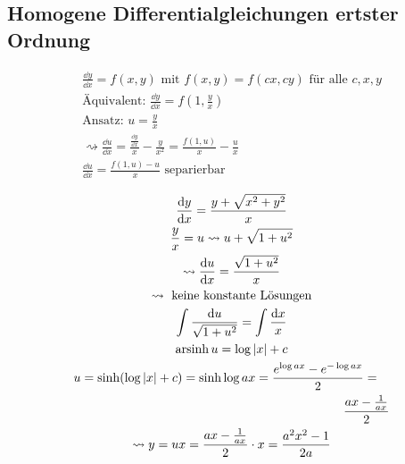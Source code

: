 \subsection{Homogene Differentialgleichungen ertster Ordnung}
\begin{gather*}
	\frac{\dd y}{\dd x} = f(x,y) \text{ mit } f(x,y) = f(cx,cy) \text{ für alle } c , x , y \\
	\text{Äquivalent: } \frac{\dd y}{\dd x} = f\left( 1 , \frac{y}{x} \right) \\
	\text{Ansatz: } u = \frac{y}{x} \\
	\rightsquigarrow \frac{\dd u}{\dd x} = \frac{\frac{\dd y}{\dd x}}{x} - \frac{y}{x^2} = \frac{f(1,u)}{x} - \frac{u}{x} \\
	\frac{\dd u}{\dd x} = \frac{f(1,u) - u}{x} \text{ separierbar}
\end{gather*}
\begin{bsp*}
	\begin{gather*}
		\frac{\dd y}{\dd x} = \frac{y+\sqrt{x^2+y^2}}{x} \\
		\frac{y}{x} = u \rightsquigarrow u + \sqrt{1+u^2} \\
		\rightsquigarrow \frac{\dd u}{\dd x} = \frac{\sqrt{1+u^2}}{x} \\
		\rightsquigarrow \text{ keine konstante Lösungen} \\
		\int \frac{\dd u}{\sqrt{1+u^2}} = \int \frac{\dd x}{x} \\
		\arsinh u = \log\abs{x} + c \\
		\begin{multlined}
			u = \sinh( \log\abs{x} + c) = \sinh\log ax = \frac{e^{\log ax} - e^{-\log ax}}{2} = \\
			\frac{ax - \frac{1}{ax}}{2}
		\end{multlined} \\
		\rightsquigarrow y = ux = \frac{ax - \frac{1}{ax}}{2} \cdot x = \frac{a^2 x^2 - 1}{2a}
	\end{gather*}
\end{bsp*}
